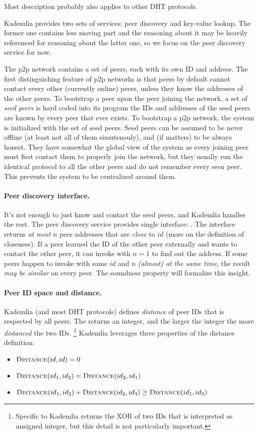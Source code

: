 {\tiny Most description probably also applies to other DHT protocols.}

Kademlia provides two sets of services: peer discovery and key-value lookup.
The former one contains less moving part and the reasoning about it may be heavily referenced for reasoning about the latter one, so we focus on the peer discovery service for now.

The p2p network contains a set of peers, each with its own ID and address.
The first distinguishing feature of p2p networks is that peers by default cannot contact every other (currently online) peers, unless they know the addresses of the other peers.
To bootstrap a peer \ie upon the peer joining the network, a set of \emph{seed peers} is hard coded into its program \ie the IDs and addresses of the seed peers are known by every peer that ever exists.
To bootstrap a p2p network, the system is initialized with the set of seed peers.
Seed peers can be assumed to be never offline (at least not all of them simutenouly), and (if matters) to be always honest.
They have somewhat the global view of the system as every joining peer must first contact them to properly join the network, but they usually run the identical protocol to all the other peers and \eg do not remember every seen peer.
This prevents the system to be centralized around them.

\paragraph{Peer discovery interface.}
It's not enough to just know and contact the seed peers, and Kademlia handles the rest.
The peer discovery service provides single interface: \find[$id$, $n$].
The interface returns \emph{at most} $n$ peer addresses that are \emph{close} to $id$ (more on the definition of closeness).
If a peer learned the ID of the other peer externally and wants to contact the other peer, it can invoke \find with $n = 1$ to find out the address.
If some peers happen to invoke \find with same $id$ and $n$ \emph{(almost) at the same time}, the result \emph{may be similar} on every peer.
The soundness property will formalize this insight.

\paragraph{Peer ID space and distance.}
Kademlia (and most DHT protocols) defines \emph{distance} of peer IDs that is respected by all peers.
The \dist[$id_1$, $id_2$] returns an integer, and the larger the integer the more \emph{distanced} the two IDs.
\footnote{Specific to Kademlia \dist returns the XOR of two IDs that is interpreted as unsigned integer, but this detail is not particularly important.}
Kademlia leverages three properties of the distance definition:
\begin{itemize}
    \item $\dist[id, id] = 0$
    \item $\dist[id_1, id_2] = \dist[id_2, id_1]$
    \item $\dist[id_1, id_2] + \dist[id_2, id_3] \geq \dist[id_1, id_3]$
\end{itemize}

